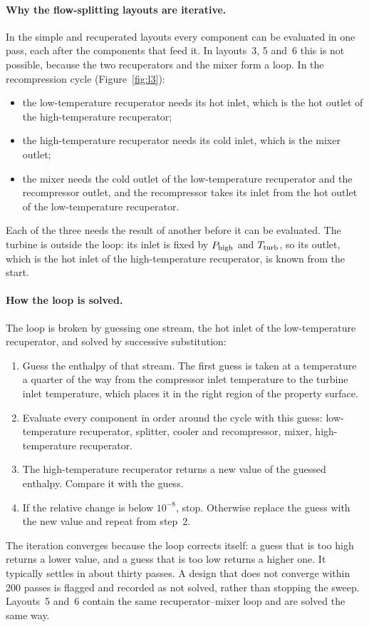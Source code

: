 \paragraph{Why the flow-splitting layouts are iterative.} In the simple and recuperated layouts every component can be evaluated in one pass, each after the components that feed it. In layouts~3, 5 and~6 this is not possible, because the two recuperators and the mixer form a loop. In the recompression cycle (Figure~\ref{fig:l3}):
\begin{itemize}
  \item the low-temperature recuperator needs its hot inlet, which is the hot outlet of the high-temperature recuperator;
  \item the high-temperature recuperator needs its cold inlet, which is the mixer outlet;
  \item the mixer needs the cold outlet of the low-temperature recuperator and the recompressor outlet, and the recompressor takes its inlet from the hot outlet of the low-temperature recuperator.
\end{itemize}
Each of the three needs the result of another before it can be evaluated. The turbine is outside the loop: its inlet is fixed by $P_\mathrm{high}$ and $T_\mathrm{turb}$, so its outlet, which is the hot inlet of the high-temperature recuperator, is known from the start.

\paragraph{How the loop is solved.} The loop is broken by guessing one stream, the hot inlet of the low-temperature recuperator, and solved by successive substitution:
\begin{enumerate}
  \item Guess the enthalpy of that stream. The first guess is taken at a temperature a quarter of the way from the compressor inlet temperature to the turbine inlet temperature, which places it in the right region of the property surface.
  \item Evaluate every component in order around the cycle with this guess: low-temperature recuperator, splitter, cooler and recompressor, mixer, high-temperature recuperator.
  \item The high-temperature recuperator returns a new value of the guessed enthalpy. Compare it with the guess.
  \item If the relative change is below $10^{-8}$, stop. Otherwise replace the guess with the new value and repeat from step~2.
\end{enumerate}
The iteration converges because the loop corrects itself: a guess that is too high returns a lower value, and a guess that is too low returns a higher one. It typically settles in about thirty passes. A design that does not converge within 200 passes is flagged and recorded as not solved, rather than stopping the sweep. Layouts~5 and~6 contain the same recuperator--mixer loop and are solved the same way.

